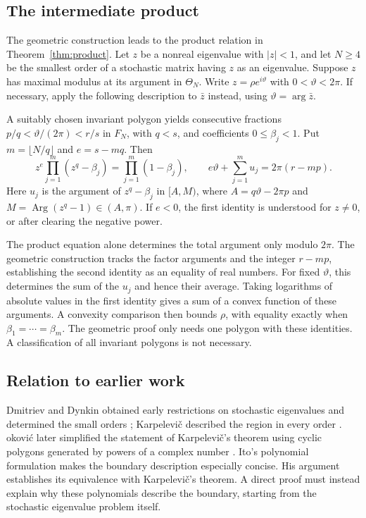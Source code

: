 \documentclass[11pt,a4paper]{article}
\DeclareMathOperator{\Arg}{Arg}
\theoremstyle{definition}
\theoremstyle{remark}
\numberwithin{equation}{section}
\begin{document}
\subsection*{The intermediate product}

The geometric construction leads to the product relation in
Theorem~\ref{thm:product}. Let $z$ be a nonreal eigenvalue with
$|z|<1$, and let $N\ge4$ be the smallest order of a stochastic matrix
having $z$ as an eigenvalue. Suppose $z$ has maximal modulus at its
argument in $\Theta_N$. Write $z=\rho e^{i\vartheta}$ with $0<\vartheta<2\pi$.
If necessary, apply the following description to $\bar z$ instead,
using $\vartheta=\arg\bar z$.

A suitably chosen invariant polygon yields consecutive fractions
$p/q<\vartheta/(2\pi)<r/s$ in $F_N$, with $q<s$, and coefficients
$0\le\beta_j<1$. Put $m=\lfloor N/q\rfloor$ and $e=s-mq$. Then
\[
 z^e\prod_{j=1}^{m}(z^q-\beta_j)
       =\prod_{j=1}^{m}(1-\beta_j),
 \qquad
 e\vartheta+\sum_{j=1}^{m}u_j=2\pi(r-mp).
\]
Here $u_j$ is the argument of $z^q-\beta_j$ in $[A,M)$, where
$A=q\vartheta-2\pi p$ and $M=\Arg(z^q-1)\in(A,\pi)$.
If $e<0$, the first identity is understood for $z\ne0$, or after
clearing the negative power.

The product equation alone determines the total argument only modulo
$2\pi$. The geometric construction tracks the factor arguments and
the integer $r-mp$, establishing the second identity as an equality
of real numbers. For fixed $\vartheta$, this determines the sum of
the $u_j$ and hence their average. Taking logarithms of absolute
values in the first identity gives a sum of a convex function of
these arguments. A convexity comparison then bounds $\rho$, with
equality exactly when $\beta_1=\cdots=\beta_m$.
The geometric proof only needs one polygon with these identities.
A classification of all invariant polygons is not necessary.

\subsection*{Relation to earlier work}

Dmitriev and Dynkin obtained early restrictions on stochastic eigenvalues and determined the small orders \cite{DD}; Karpelevi\v{c} described the region in every order \cite{Karp}. \DJ okovi\'c later simplified the statement of Karpelevi\v{c}'s theorem using cyclic polygons generated by powers of a complex number \cite{Djokovic}. Ito's polynomial formulation \cite{Ito} makes the boundary description especially concise. His argument establishes its equivalence with Karpelevi\v{c}'s theorem. A direct proof must instead explain why these polynomials describe the boundary, starting from the stochastic eigenvalue problem itself.
\end{document}
